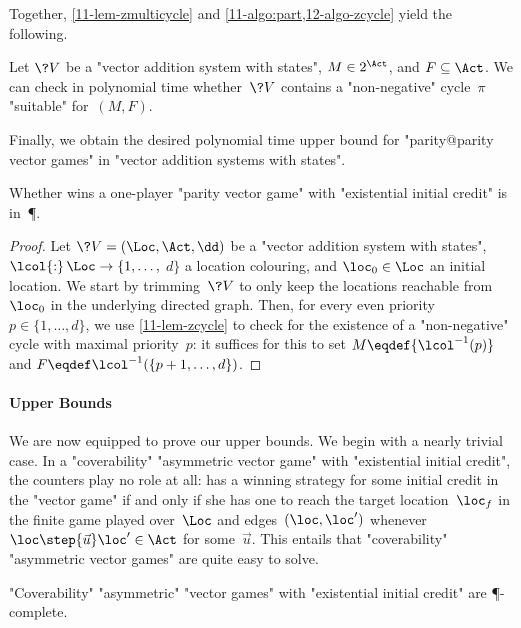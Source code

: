 \begin{scope}
Together, \cref{11-lem-zmulticycle}
and \cref{11-algo:part,12-algo-zcycle} yield the following.

\begin{lemma}\label{11-lem-zcycle}
  Let $\?V$ be a "vector addition system with states",
  $M\in 2^{\Act}$, and $F\subseteq\Act$.  We can check in polynomial
  time whether~$\?V$ contains a "non-negative" cycle~$\pi$
  "suitable" for~$(M,F)$.
\end{lemma}

Finally, we obtain the desired polynomial time upper bound for
"parity@parity vector games" in "vector addition systems with states".
\begin{theorem}\label{11-thm-zcycle}
  Whether \Eve wins a one-player "parity vector game" with
  "existential initial credit" is in~\P.
\end{theorem}
\begin{proof}
  Let $\?V=(\Loc,\Act,\dd)$ be a "vector addition system with states",
  $\lcol{:}\,\Loc\to\{1,\dots,$ $d\}$ a location colouring, and
  $\loc_0\in\Loc$ an initial location.  We start by trimming~$\?V$ to
  only keep the locations reachable from~$\loc_0$ in the underlying
  directed graph.  Then, for every even priority $p\in\{1,\dots,d\}$,
  we use \cref{11-lem-zcycle} to check for the existence of a
  "non-negative" cycle with maximal priority~$p$: it suffices for this
  to set $M\eqdef\{\lcol^{-1}(p)\}$ and
  $F\eqdef\lcol^{-1}(\{p+1,\dots,d\})$.
\end{proof}
\end{scope}

\paragraph{Upper Bounds}
We are now equipped to prove our upper bounds.  We begin with a nearly
trivial case.  In a "coverability" "asymmetric vector game" with
"existential initial credit", the counters play no role at all: \Eve
has a winning strategy for some initial credit in the "vector game" if
and only if she has one to reach the target location~$\loc_f$ in the
finite game played over~$\Loc$ and edges~$(\loc,\loc')$ whenever
$\loc\step{\vec u}\loc'\in\Act$ for some~$\vec u$.  This entails that
"coverability" "asymmetric vector games" are quite easy to solve.

\begin{theorem}\label{11-cov-exist-P}
  "Coverability" "asymmetric" "vector games" with "existential initial
  credit" are \P-complete.
\end{theorem}

